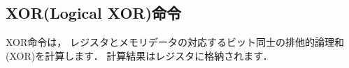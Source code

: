 \begin{description}
\begin{center}
\epsfxsize=5cm
\end{center}

\end{description}


\newpage
\subsection{XOR(Logical XOR)命令}
XOR命令は，
レジスタとメモリデータの対応するビット同士の排他的論理和(XOR)を計算します．
計算結果はレジスタに格納されます．

